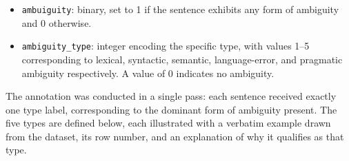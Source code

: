 \begin{itemize}
    \item \texttt{ambuiguity}: binary, set to 1 if the sentence exhibits any form of ambiguity and 0 otherwise.
    \item \texttt{ambiguity\_type}: integer encoding the specific type, with values 1--5 corresponding to lexical, syntactic, semantic, language-error, and pragmatic ambiguity respectively. A value of 0 indicates no ambiguity.
\end{itemize}

The annotation was conducted in a single pass: each sentence received exactly one type label, corresponding to the dominant form of ambiguity present. The five types are defined below, each illustrated with a verbatim example drawn from the dataset, its row number, and an explanation of why it qualifies as that type.

